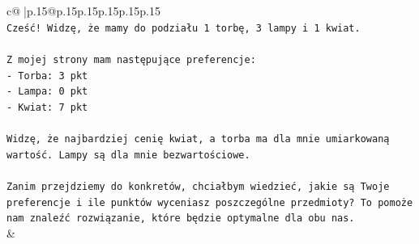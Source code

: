 \documentclass{article}
\begin{document}
{\begin{supertabular}{c@{$\;$}|p{.15\linewidth}@{}p{.15\linewidth}p{.15\linewidth}p{.15\linewidth}p{.15\linewidth}p{.15\linewidth}}
{{{\\ 
\texttt{Cześć! Widzę, że mamy do podziału 1 torbę, 3 lampy i 1 kwiat.} \\
\\ 
\texttt{Z mojej strony mam następujące preferencje:} \\
\texttt{{-} Torba: 3 pkt} \\
\texttt{{-} Lampa: 0 pkt} \\
\texttt{{-} Kwiat: 7 pkt} \\
\\ 
\texttt{Widzę, że najbardziej cenię kwiat, a torba ma dla mnie umiarkowaną wartość. Lampy są dla mnie bezwartościowe.} \\
\\ 
\texttt{Zanim przejdziemy do konkretów, chciałbym wiedzieć, jakie są Twoje preferencje i ile punktów wyceniasz poszczególne przedmioty? To pomoże nam znaleźć rozwiązanie, które będzie optymalne dla obu nas.} \\
            }
        }
    }
    & \\ \\


\end{supertabular}}
\end{document}
